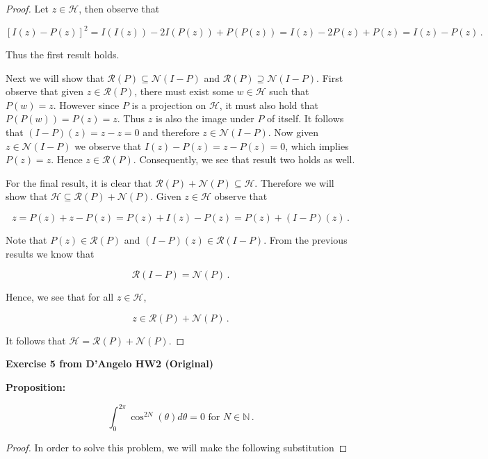 \documentclass[a4paper]{article}
\numberwithin{equation}{section}
\begin{document}
\begin{description}
\begin{enumerate}
\end{enumerate}

\begin{proof} Let $z \in \mathcal{H}$, then observe that

$$[I(z) - P(z)]^2 = I(I(z)) -2I(P(z)) + P(P(z)) = I(z) - 2P(z) + P(z) = I(z) - P(z)\,.$$

Thus the first result holds. 

Next we will show that $\mathcal{R}(P) \subseteq \mathcal{N}(I-P)$ and $\mathcal{R}(P) \supseteq \mathcal{N}(I-P)$. First observe that given $z \in \mathcal{R}(P)$, there must exist some $w \in \mathcal{H}$ such that $P(w) = z$. However since $P$ is a projection on $\mathcal{H}$, it must also hold that $P(P(w)) = P(z) = z$. Thus $z$ is also the image under $P$ of itself. It follows that $(I-P)(z) = z-z = 0$ and therefore $z \in \mathcal{N}(I-P)$. Now given $z \in \mathcal{N}(I-P)$ we observe that $I(z) - P(z) = z - P(z) = 0$, which implies $P(z) = z$. Hence $z \in \mathcal{R}(P)$. Consequently, we see that result two holds as well.

For the final result, it is clear that $\mathcal{R}(P)+\mathcal{N}(P) \subseteq \mathcal{H}$. Therefore we will show that $\mathcal{H} \subseteq \mathcal{R}(P)+\mathcal{N}(P)$. Given $z \in \mathcal{H}$ observe that

$$z = P(z) + z - P(z) = P(z) + I(z) - P(z) = P(z) + (I-P)(z)\,.$$

Note that $P(z) \in \mathcal{R}(P)$ and $(I-P)(z) \in \mathcal{R}(I-P)$. From the previous results we know that

$$\mathcal{R}(I-P) = \mathcal{N}(P)\,.$$

Hence, we see that for all $z \in \mathcal{H}$, 

$$z \in \mathcal{R}(P) + \mathcal{N}(P)\,.$$

It follows that $\mathcal{H} = \mathcal{R}(P) + \mathcal{N}(P)$.

\end{proof}

\item \textbf{Exercise 5 from D'Angelo HW2 (Original)}

\item{\bf{Proposition:}} 

$$\int_0^{2\pi} \cos^{2N}(\theta)d\theta = 0 \text{ for } N \in \mathbb{N}\,.$$

\begin{proof} In order to solve this problem, we will make the following substitution


\end{proof}
\end{description}
\end{document}
